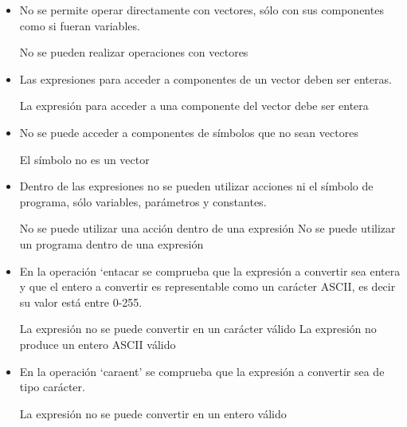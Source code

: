 \begin{itemize}
    \item  No se permite operar directamente con vectores, sólo con sus componentes como si fueran variables.

    \begin{codigo}
    No se pueden realizar operaciones con vectores
    \end{codigo}

    \item Las expresiones para acceder a componentes de un vector deben ser enteras.

    \begin{codigo}
    La expresión para acceder a una componente del vector debe ser entera
    \end{codigo}

    \item No se puede acceder a componentes de símbolos que no sean vectores

    \begin{codigo}
    El símbolo no es un vector
    \end{codigo}

    \item Dentro de las expresiones no se pueden utilizar acciones ni el símbolo de programa, sólo variables, parámetros y constantes.

    \begin{codigo}
    No se puede utilizar una acción dentro de una expresión
    No se puede utilizar un programa dentro de una expresión
    \end{codigo}


    \item En la operación `entacar se comprueba que la expresión a convertir sea entera y que el entero a convertir es representable como un carácter ASCII, es decir su valor está entre 0-255.

    \begin{codigo}
    La expresión no se puede convertir en un carácter válido
    La expresión no produce un entero ASCII válido
    \end{codigo}

    \item En la operación `caraent' se comprueba que la expresión a convertir sea de tipo carácter.

    \begin{codigo}
    La expresión no se puede convertir en un entero válido
    \end{codigo}

    \end{itemize}


